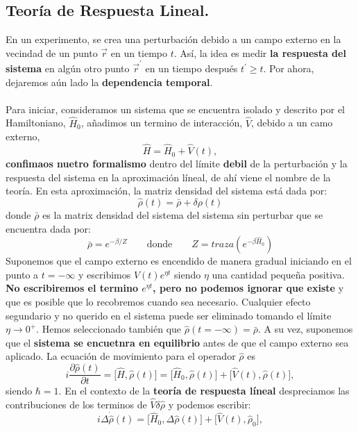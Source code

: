\subsection{Teoría de Respuesta Lineal.}
En un experimento, se crea una perturbación debido a un campo externo en la vecindad de un punto $\vec{r}$ en un tiempo $t$. Así, la idea es medir \textbf{la respuesta del sistema} en algún otro punto $\vec{r}^{\prime}$ en un tiempo después $t^{\prime} \geq t$. Por ahora, dejaremos aún lado la \textbf{dependencia temporal}.\\ \\
Para iniciar, consideramos un sistema que se encuentra isolado y descrito por el Hamiltoniano, $\hat{H}_{0}$, añadimos un termino de interacción, $\hat{V}$, debido a un camo externo,
\begin{equation}
    \hat{H}= \hat{H}_{0} + \hat{V} (t),
\end{equation}
\textbf{confimaos nuetro formalismo} dentro del límite \textbf{debil} de la perturbación y la respuesta del sistema en la aproximación líneal, de ahí viene el nombre de la teoría. En esta aproximación, la matriz densidad del sistema está dada por:
\begin{equation}
    \hat{\rho} (t) = \bar{\rho} + \delta \rho (t)
\end{equation}
donde $\bar{\rho}$ es la matrix densidad del sistema del sistema sin perturbar que se encuentra dada por:
\begin{equation}
    \bar{\rho} = e^{-\beta/Z} \quad \quad \text{donde} \quad \quad Z = traza \left( e^{-\beta \hat{H}_{0}}\right)
\end{equation}
Suponemos que el campo externo es encendido de manera gradual iniciando en el punto a $t= - \infty$ y escribimos $V(t)e^{\eta t} $ siendo $\eta$ una cantidad pequeña positiva. \textbf{No escribiremos el termino $e^{\eta t}$, pero no podemos ignorar que existe} y que es posible que lo recobremos cuando sea necesario. Cualquier efecto segundario y no querido en el sistema puede ser eliminado tomando el límite $\eta \longrightarrow 0^{+}$. Hemos seleccionado también que $\hat{\rho} (t=-\infty) = \bar{\rho}$. A su vez, suponemos que el \textbf{sistema se encuetnra en equilibrio} antes de que el campo externo sea aplicado. La ecuación de movimiento para el operador $\hat{\rho}$ es 
\begin{equation}
    i \frac{\partial \hat{\rho} (t)}{\partial t} = \big[ \hat{H},\hat{\rho}(t)  \big] =  \big[ \hat{H}_{0},\hat{\rho}(t)  \big] + \big[ \hat{V}(t),\hat{\rho}(t)  \big],
\end{equation}
siendo $\hbar = 1$. En el contexto de la \textbf{teoría de respuesta líneal} despreciamos las contribuciones de los terminos de $\hat{V} \delta \hat{\rho}$ y podemos escribir:
\begin{equation}
    i \Delta \dot{\hat{\rho}}(t) = \big[ \hat{H}_{0}, \Delta \hat{\rho}(t)  \big] +\big[ \hat{V}(t),\hat{\rho}_{0}  \big],
\end{equation}






